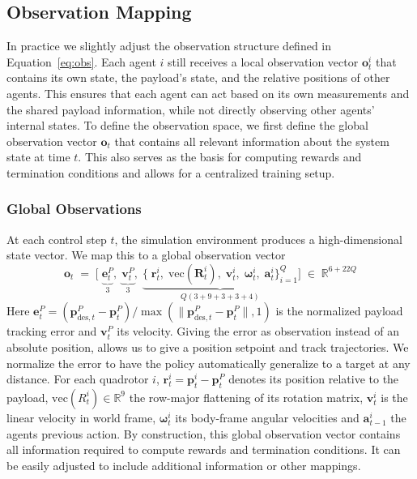\subsection{Observation Mapping}
In practice we slightly adjust the observation structure defined in Equation~\eqref{eq:obs}. Each agent \(i\) still receives a local observation vector \(\mathbf{o}^i_t\) that contains its own state, the payload's state, and the relative positions of other agents.  This ensures that each agent can act based on its own measurements and the shared payload information, while not directly observing other agents' internal states. To define the observation space, we first define the global observation vector \(\mathbf{o}_t\) that contains all relevant information about the system state at time \(t\). This also serves as the basis for computing rewards and termination conditions and allows for a centralized training setup.
\subsubsection{Global Observations}
At each control step \(t\), the simulation environment produces a high-dimensional state vector. We map this to a global observation vector 
\begin{equation}
\mathbf{o}_t \;=\; \bigl[\;\underbrace{\mathbf{e}^P_t}_{3},\;\underbrace{\mathbf{v}^P_t}_{3},\;\underbrace{\{\;\mathbf{r}^i_t,\;\mathrm{vec}(\mathbf{R}^i_t),\;\mathbf{v}^i_t,\;\boldsymbol{\omega}^i_t,\;\mathbf{a}^i_t\}_{i=1}^Q}_{Q(3+9+3+3+4)}\bigr] \;\in\;\mathbb{R}^{6 + 22Q}
\end{equation}
Here \(\mathbf{e}^P_t = (\mathbf{p}^P_{\mathrm{des},t}-\mathbf{p}^P_t)/\max(\|\mathbf{p}^P_{\mathrm{des},t}-\mathbf{p}^P_t\|,1)\) is the normalized payload tracking error and \(\mathbf{v}^P_t\) its velocity. Giving the error as observation instead of an absolute position, allows us to give a position setpoint and track trajectories. We normalize the error to have the policy automatically generalize to a target at any distance. For each quadrotor \(i\), \(\mathbf{r}^i_t=\mathbf{p}^i_t-\mathbf{p}^P_t\) denotes its position relative to the payload, \(\mathrm{vec}(R^i_t)\in\mathbb{R}^9\) the row-major flattening of its rotation matrix, \(\mathbf{v}^i_t\) is the linear velocity in world frame, \(\boldsymbol{\omega}^i_t\) its body-frame angular velocities and \(\mathbf{a}^i_{t-1}\) the agents previous action. By construction, this global observation vector contains all information required to compute rewards and termination conditions. It can be easily adjusted to include additional information or other mappings.

